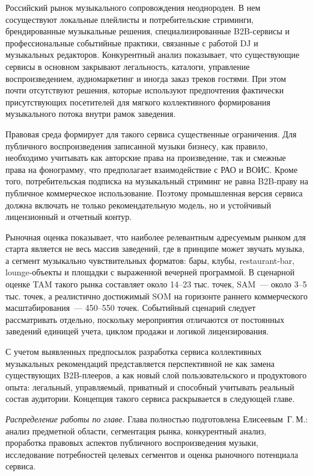 Российский рынок музыкального сопровождения неоднороден. В нем сосуществуют локальные плейлисты и потребительские стриминги, брендированные музыкальные решения, специализированные B2B-сервисы и профессиональные событийные практики, связанные с работой DJ и музыкальных редакторов. Конкурентный анализ показывает, что существующие сервисы в основном закрывают легальность, каталоги, управление воспроизведением, аудиомаркетинг и иногда заказ треков гостями. При этом почти отсутствуют решения, которые используют предпочтения фактически присутствующих посетителей для мягкого коллективного формирования музыкального потока внутри рамок заведения.

Правовая среда формирует для такого сервиса существенные ограничения. Для публичного воспроизведения записанной музыки бизнесу, как правило, необходимо учитывать как авторские права на произведение, так и смежные права на фонограмму, что предполагает взаимодействие с РАО и ВОИС. Кроме того, потребительская подписка на музыкальный стриминг не равна B2B-праву на публичное коммерческое использование. Поэтому промышленная версия сервиса должна включать не только рекомендательную модель, но и устойчивый лицензионный и отчетный контур.

Рыночная оценка показывает, что наиболее релевантным адресуемым рынком для старта является не весь массив заведений, где в принципе может звучать музыка, а сегмент музыкально чувствительных форматов: бары, клубы, restaurant-bar, lounge-объекты и площадки с выраженной вечерней программой. В сценарной оценке TAM такого рынка составляет около 14--23 тыс. точек, SAM~--- около 3--5 тыс. точек, а реалистично достижимый SOM на горизонте раннего коммерческого масштабирования~--- 450--550 точек. Событийный сценарий следует рассматривать отдельно, поскольку мероприятия отличаются от постоянных заведений единицей учета, циклом продажи и логикой лицензирования.

С учетом выявленных предпосылок разработка сервиса коллективных музыкальных рекомендаций представляется перспективной не как замена существующих B2B-плееров, а как новый слой пользовательского и продуктового опыта: легальный, управляемый, приватный и способный учитывать реальный состав аудитории. Концепция такого сервиса раскрывается в следующей главе.

\textit{Распределение работы по главе.} Глава полностью подготовлена Елисеевым~Г.\,М.: анализ предметной области, сегментация рынка, конкурентный анализ, проработка правовых аспектов публичного воспроизведения музыки, исследование потребностей целевых сегментов и оценка рыночного потенциала сервиса.
